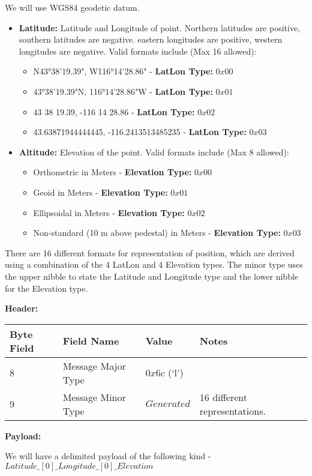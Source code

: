 \begin{framed}
We will use WGS84 geodetic datum.
\begin{itemize}
\item \textbf{Latitude:} Latitude and Longitude of point. Northern latitudes are positive, southern latitudes are negative.
  eastern longitudes are positive, western longitudes are negative. Valid formats include (Max 16 allowed):
\begin{itemize}
  \item N43°38'19.39", W116°14'28.86" - \textbf{LatLon Type:} ${0x00}$
  \item 43°38'19.39"N, 116°14'28.86"W - \textbf{LatLon Type:} ${0x01}$
  \item 43 38 19.39, -116 14 28.86 - \textbf{LatLon Type:} ${0x02}$
  \item 43.63871944444445, -116.2413513485235 - \textbf{LatLon Type:} ${0x03}$

\end{itemize}
\item \textbf{Altitude:} Elevation of the point. Valid formats include (Max 8 allowed):
\begin{itemize}
   \item Orthometric in Meters - \textbf{Elevation Type:} ${0x00}$
   \item Geoid in Meters - \textbf{Elevation Type:} ${0x01}$
   \item Ellipsoidal in Meters - \textbf{Elevation Type:} ${0x02}$
   \item Non-standard (10 m above pedestal) in Meters - \textbf{Elevation Type:} ${0x03}$
\end{itemize}

\end{itemize}

There are 16 different formats for representation of position, which are derived using a
combination of the 4 LatLon and 4 Elevation types. The minor type uses the upper nibble to
state the Latitude and Longitude type and the lower nibble for the Elevation type.
\\


\end{framed}
\textbf{Header:}
\begin{center}
    \begin{tabular}{ | l | l | p{3cm} | p{5cm} |}
    \hline
    \hline
    \textbf{Byte Field} & \textbf{Field Name} & \textbf{Value} & \textbf{Notes} \\ \hline \hline
    8 & Message Major Type & $0x6c$ (`l') &  \\    \hline
    9 & Message Minor Type & $Generated$ & 16 different representations.  \\   \hline
    \end{tabular}
\end{center}
\noindent
\textbf{Payload:}
\begin{framed}
We will have a delimited payload of the following kind -
\\
$Latitude\_[0]\_Longitude\_[0]\_Elevation$
\end{framed}

